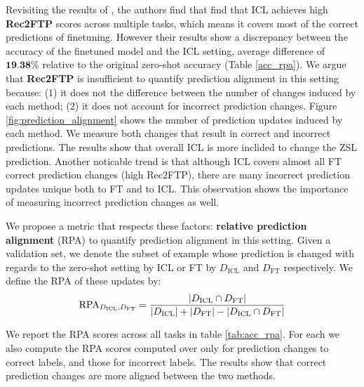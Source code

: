 Revisiting the results of \cite{dai2023gpt}, the authors find that find that ICL achieves high \textbf{Rec2FTP} scores across multiple tasks, which means it covers most of the correct predictions of finetuning. 
However their results show a discrepancy between the accuracy of the finetuned model and the ICL setting, average difference of $\textbf{19.38\%}$ relative to the original zero-shot accuracy (Table \ref{acc_rpa}).
We argue that \textbf{Rec2FTP} is insufficient to quantify prediction alignment in this setting because:
(1) it does not the difference between the number of changes induced by each method;
(2) it does not account for incorrect prediction changes.
Figure \ref{fig:prediction_alignment} shows the number of prediction updates induced by each method.
We measure both changes that result in correct and incorrect predictions.
The results show that overall ICL is more inclided to change the ZSL prediction.
Another noticable trend is that although ICL covers almost all FT correct prediction changes (high Rec2FTP), there are many incorrect prediction updates unique both to FT and to ICL.
This observation shows the importance of measuring incorrect prediction changes as well.



We propose a metric that respects these factors: \textbf{relative prediction alignment} (RPA) to quantify prediction alignment in this setting.
Given a validation set, we denote the subset of example whose prediction is changed with regards to the zero-shot setting by ICL or FT by $D_\text{ICL}$ and $D_\text{FT}$ respectively.
We define the RPA of these updates by: 
\begin{equation*}
  \text{RPA}_{D_\text{ICL}, D_\text{FT}} = \frac{\left|D_\text{ICL} \cap D_\text{FT}\right|}{\left|D_\text{ICL}\right| + \left|D_\text{FT}\right| - \left|D_\text{ICL} \cap D_\text{FT}\right|} 
\end{equation*}



We report the RPA scores across all tasks in table \ref{tab:acc_rpa}.
For each we also compute the RPA scores computed over only for prediction changes to correct labels, and those for incorrect labels.
The results show that correct prediction changes are more aligned between the two methods.